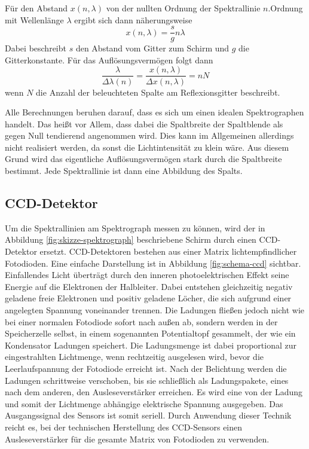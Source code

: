 		Für den Abstand $x(n,\lambda)$ von der nullten Ordnung der Spektrallinie $n$.Ordnung mit Wellenlänge $\lambda$ ergibt sich dann näherungsweise
		\[ x(n,\lambda) = \frac{s}{g}n\lambda \]
		Dabei beschreibt $s$ den Abstand vom Gitter zum Schirm und $g$ die Gitterkonstante.
		Für das Auflösungsvermögen folgt dann
		\[ \frac{\lambda}{\Delta\lambda(n)} = \frac{x(n,\lambda)}{\Delta x(n,\lambda)} = nN \]
		wenn $N$ die Anzahl der beleuchteten Spalte am Reflexionsgitter beschreibt.

		Alle Berechnungen beruhen darauf, dass es sich um einen idealen Spektrographen handelt.
		Das heißt vor Allem, dass dabei die Spaltbreite der Spaltblende als gegen Null tendierend angenommen wird.
		Dies kann im Allgemeinen allerdings nicht realisiert werden, da sonst die Lichtintensität zu klein wäre.
		Aus diesem Grund wird das eigentliche Auflösungsvermögen stark durch die Spaltbreite bestimmt.
		Jede Spektrallinie ist dann eine Abbildung des Spalts.
	

	\subsection{CCD-Detektor} %
	\label{sub:ccd_detektor}

		Um die Spektrallinien am Spektrograph messen zu können, wird der in Abbildung \ref{fig:skizze-spektrograph} beschriebene Schirm durch einen CCD-Detektor ersetzt.
		CCD-Detektoren bestehen aus einer Matrix lichtempfindlicher Fotodioden.
		Eine einfache Darstellung ist in Abbildung \ref{fig:schema-ccd} sichtbar.
		Einfallendes Licht überträgt durch den inneren photoelektrischen Effekt seine Energie auf die Elektronen der Halbleiter. 
		Dabei entstehen gleichzeitig negativ geladene freie Elektronen und positiv geladene \glqq Löcher\grqq, die sich aufgrund einer angelegten Spannung voneinander trennen. 
		Die Ladungen fließen jedoch nicht wie bei einer normalen Fotodiode sofort nach außen ab, sondern werden in der Speicherzelle selbst, in einem sogenannten Potentialtopf gesammelt, der wie ein Kondensator Ladungen speichert. 
		Die Ladungsmenge ist dabei proportional zur eingestrahlten Lichtmenge, wenn rechtzeitig ausgelesen wird, bevor die Leerlaufspannung der Fotodiode erreicht ist.
		Nach der Belichtung werden die Ladungen schrittweise verschoben, bis sie schließlich als Ladungspakete, eines nach dem anderen, den Ausleseverstärker erreichen. 
		Es wird eine von der Ladung und somit der Lichtmenge abhängige elektrische Spannung ausgegeben.
		Das Ausgangssignal des Sensors ist somit seriell.
		Durch Anwendung dieser Technik reicht es, bei der technischen Herstellung des CCD-Sensors einen Ausleseverstärker für die gesamte Matrix von Fotodioden zu verwenden.

